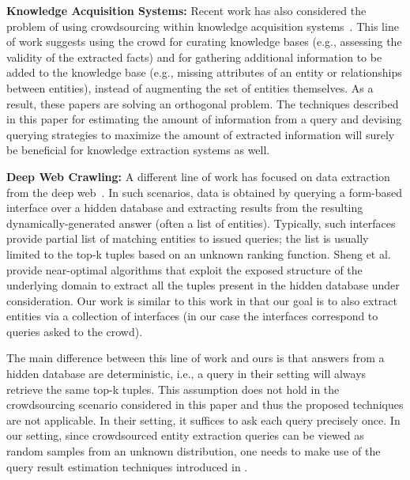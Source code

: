 \vspace{3pt}\noindent\textbf{Knowledge Acquisition Systems:} Recent work has also considered the problem of using crowdsourcing within knowledge acquisition systems~\cite{jiang:13, kondredi:2014, west:2014}. This line of work suggests using the crowd for curating knowledge bases (e.g., assessing the validity of the extracted facts) and for gathering additional information to be added to the knowledge base (e.g., missing attributes of an entity or relationships between entities), instead of augmenting the set of entities themselves. As a result, these papers are solving an orthogonal problem. The techniques described in this paper for estimating the amount of information from a query and devising querying strategies to maximize the amount of extracted information will surely be beneficial for knowledge extraction systems as well.

\vspace{3pt}\noindent\textbf{Deep Web Crawling:} A different line of work has focused on data extraction from the deep web~\cite{Jin:2011,Sheng:2012}. In such scenarios, data is obtained by querying a form-based interface over a hidden database and extracting results from the resulting dynamically-generated answer (often a list of entities). Typically, such interfaces provide partial list of matching entities to issued queries; the list is usually limited to the top-k tuples based on an unknown ranking function. Sheng et al.~\cite{Sheng:2012} provide near-optimal algorithms that exploit the exposed structure of the underlying domain to extract all the tuples present in the hidden database under consideration. Our work is similar to this work in that our goal is to also extract entities via a collection of interfaces (in our case the interfaces correspond to queries asked to the crowd).

The main difference between this line of work and ours is that answers from a hidden database are deterministic, i.e., a query in their setting will always retrieve the same top-k tuples. This assumption does not hold in the crowdsourcing scenario considered in this paper and thus the proposed techniques are not applicable. In their setting, it suffices to ask each query precisely once. In our setting, since crowdsourced entity extraction queries can be viewed as random samples from an unknown  distribution, one needs to make use of the query result estimation techniques introduced in .